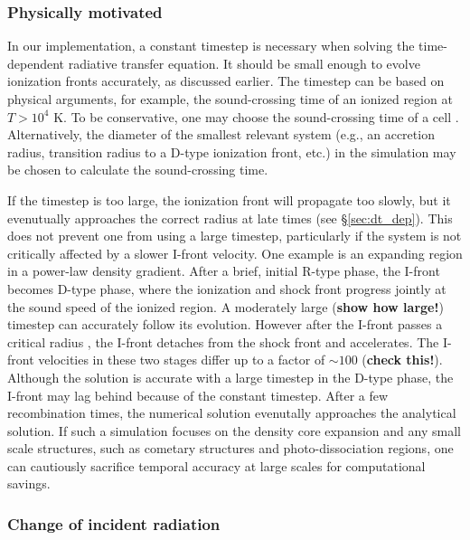 \documentclass[12pt,preprint]{aastex}
\begin{document}
\subsubsection{Physically motivated}
\label{sec:dt_const}

In our implementation, a constant timestep is necessary when solving
the time-dependent radiative transfer equation.  It should be small
enough to evolve ionization fronts accurately, as discussed earlier.
The timestep can be based on physical arguments, for example, the
sound-crossing time of an ionized region at $T > 10^4$ K.  To be
conservative, one may choose the sound-crossing time of a cell
\citep[e.g.][]{Abel07, Wise08b}.  Alternatively, the diameter of the
smallest relevant system (e.g., an accretion radius, transition radius
to a D-type ionization front, etc.) in the simulation may be chosen to
calculate the sound-crossing time.

If the timestep is too large, the ionization front will propagate too
slowly, but it evenutually approaches the correct radius at late times
(see \S\ref{sec:dt_dep}).  This does not prevent one from using a
large timestep, particularly if the system is not critically affected
by a slower I-front velocity.  One example is an expanding 
region in a power-law density gradient.  After a brief, initial R-type
phase, the I-front becomes D-type phase, where the ionization and
shock front progress jointly at the sound speed of the ionized region.
A moderately large (\textbf{show how large!}) timestep can accurately
follow its evolution.  However after the I-front passes a critical
radius \citep[show this!][]{Franco90}, the I-front detaches from the
shock front and accelerates.  The I-front velocities in these two
stages differ up to a factor of $\sim100$ (\textbf{check this!}).
Although the solution is accurate with a large timestep in the D-type
phase, the I-front may lag behind because of the constant timestep.
After a few recombination times, the numerical solution evenutally
approaches the analytical solution.  If such a simulation focuses on
the density core expansion and any small scale structures, such as
cometary structures and photo-dissociation regions, one can cautiously
sacrifice temporal accuracy at large scales for computational savings.

\subsubsection{Change of incident radiation}
\label{sec:dt_tau}
\end{document}
